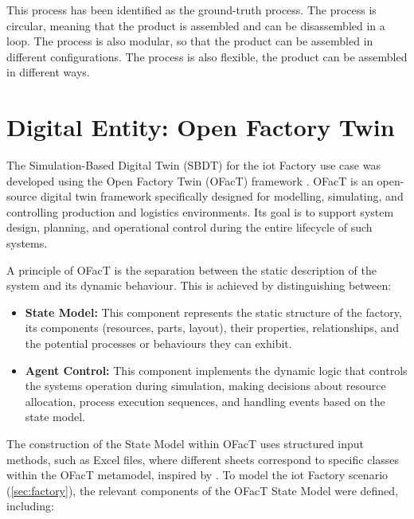 This process has been identified as the ground-truth process. The process is circular, meaning that the product is assembled and can be disassembled in a loop. The process is also modular, so that the product can be assembled in different configurations. The process is also flexible, the product can be assembled in different ways.

\section{Digital Entity: Open Factory Twin}
\label{sec:automated-digital-twin}

The Simulation-Based Digital Twin (SBDT) for the \gls{iot} Factory use case was developed using the Open Factory Twin (OFacT) framework \autocite{ofact-intern}. OFacT is an open-source digital twin framework specifically designed for modelling, simulating, and controlling production and logistics environments. Its goal is to support system design, planning, and operational control during the entire lifecycle of such systems.

A principle of OFacT is the separation between the static description of the system and its dynamic behaviour. This is achieved by distinguishing between:

\begin{itemize}
  \item \textbf{State Model:} This component represents the static structure of the factory, its components (resources, parts, layout), their properties, relationships, and the potential processes or behaviours they can exhibit.
  \item \textbf{Agent Control:} This component implements the dynamic logic that controls the systems operation during simulation, making decisions about resource allocation, process execution sequences, and handling events based on the state model.
\end{itemize}

The construction of the State Model within OFacT uses structured input methods, such as Excel files, where different sheets correspond to specific classes within the OFacT metamodel, inspired by \textcite{schwede2024learning}. To model the \gls{iot} Factory scenario (\autoref{sec:factory}), the relevant components of the OFacT State Model were defined, including:

